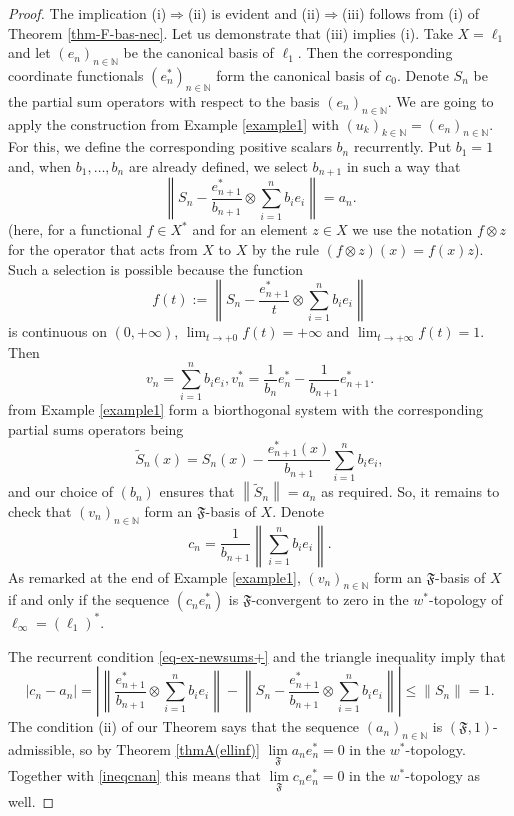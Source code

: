 \documentclass[11pt,twoside, reqno]{amsart}
\newcommand{\N}{{\mathbb N}}
\newcommand{\F}{\mathfrak{F}}
\newcommand{\flim}{\lim\limits_\F }
\theoremstyle{plain}
\theoremstyle{remark}
\theoremstyle{definition}
\numberwithin{equation}{section}
\begin{document}
\begin{proof}
The implication (i)$\Longrightarrow$(ii) is evident and (ii)$\Longrightarrow$(iii) follows from (i) of Theorem \ref{thm-F-bas-nec}. Let us demonstrate  that (iii) implies (i). Take $X=\ell_1$ and let $ (e_n)_{n \in \N}$ be the canonical basis of $\ell_1$. Then the corresponding coordinate functionals $(e_n^*)_{n \in \N}$ form the canonical basis of $c_0$. Denote $S_n$ be the partial sum operators with respect to the basis $ (e_n)_{n \in \N}$.  We are going to apply the construction from Example \ref{example1} with $(u_k)_{k \in \N} = (e_n)_{n \in \N}$. For this,  we define the corresponding positive scalars $b_n$ recurrently. Put $b_1=1$ and, when $b_1, \ldots , b_n$  are already defined, we select $b_{n+1}$ in such a way that
\begin{equation} \label{eq-ex-newsums+}
\left\| S_n - \frac{e_{n+1}^*}{b_{n+1}}\otimes \sum\limits_{i=1}^n b_ie_i\right\| = a_n.
\end{equation}
(here, for a functional $f \in X^*$ and for an element $z \in X$ we use the notation $f\otimes z$ for the operator that acts from $X$ to $X$ by the rule $(f\otimes z)(x) = f(x) z$).
Such a selection is possible because the function 
$$
f(t):= \left\|  S_n - \frac{e_{n+1}^*}{t}\otimes \sum\limits_{i=1}^n b_ie_i\right\|
$$
is continuous on $(0, +\infty)$, $\lim_{t \to +0}f(t) = +\infty$ and $\lim_{t \to +\infty}f(t) = 1$.
Then 
$$
v_n=\sum\limits_{i=1}^n b_i e_i, v_n^*=\frac{1}{b_n}e^*_n-\frac{1}{b_{n+1}}e^*_{n+1}.
$$
from Example \ref{example1} form a biorthogonal system with the corresponding partial sums operators being
$$
\tilde S_n(x)= S_n(x) - \frac{e_{n+1}^*(x)}{b_{n+1}}\sum\limits_{i=1}^n b_ie_i,
$$
and our choice of $(b_n)$ ensures that $ \left\|\tilde S_n\right\| = a_n$ as required. So, it remains to check that $(v_n)_{n \in \N}$ form an $\F$-basis of $X$. 
Denote 
$$
c_n=\frac{1}{b_{n+1}} \left\|\sum\limits_{i=1}^n b_i e_i\right\|. 
$$
As remarked at the end of Example \ref{example1}, $(v_n)_{n \in \N}$ form an $\F$-basis of $X$ if and only if the sequence $(c_n e_n^*)$ is $\F$-convergent to zero in the $w^*$-topology of $\ell_\infty = (\ell_1)^*$. 

 The recurrent condition \eqref{eq-ex-newsums+} and the triangle inequality imply that
\begin{equation} \label{ineqcnan}
|c_n - a_n|=\left|\left\|\frac{e_{n+1}^*}{b_{n+1}}\otimes \sum\limits_{i=1}^n b_ie_i\right\| - \left\| S_n - \frac{e_{n+1}^*}{b_{n+1}}\otimes \sum\limits_{i=1}^n b_ie_i\right\|\right| \le \|S_n\| = 1.
\end{equation}
The condition (ii) of our Theorem says that the sequence $ (a_n)_{n \in \N}$ is $(\F, 1)$-admissible, so by Theorem \ref{thmA(ellinf)} $\flim a_n e_n^* = 0$ in the $w^*$-topology. Together with \eqref{ineqcnan} this means that $\flim c_n e_n^* = 0$ in the $w^*$-topology as well.
\end{proof}
\end{document}
